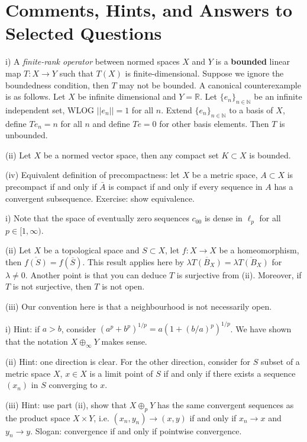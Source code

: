 \documentclass[12pt]{article}
\newcommand{\N}{\mathbb{N}}
\newcommand{\R}{\mathbb{R}}
\newenvironment{onquestion}[2][On Question]{\begin{trivlist}
\item[\hskip \labelsep {\bfseries #1}\hskip \labelsep {\bfseries #2.}]}{\end{trivlist}}
\begin{document}
\section{Comments, Hints, and Answers to Selected Questions}
\begin{onquestion}{1.2}
	(i) A \textit{finite-rank operator} between normed spaces $X$ and $Y$ is a \textbf{bounded} linear map $T:X\rightarrow Y$ such that $T(X)$ is finite-dimensional. Suppose we ignore the boundedness condition, then $T$ may not be bounded.  A canonical counterexample is as follows. Let $X$ be infinite dimensional and $Y = \R$. Let $\{e_n\}_{n\in \N}$ be an infinite independent set, WLOG $||e_n|| = 1$ for all $n$. Extend $\{e_n\}_{n\in \N}$ to a basis of $X$, define $Te_n = n$ for all $n$ and define $Te = 0$ for other basis elements.  Then $T$ is unbounded.
	
	(ii) Let $X$ be a normed vector space, then any compact set $K \subset X$ is bounded.
	
	(iv) Equivalent definition of precompactness: let $X$ be a metric space, $A \subset X$ is precompact if and only if $\bar{A}$ is compact if and only if every sequence in $A$ has a convergent subsequence. Exercise: show equivalence.
\end{onquestion}

\begin{onquestion}{1.4}
	(i) Note that the space of eventually zero sequences $c_{00}$ is dense in $\ell_p$ for all $p\in [1,\infty)$.
	
	(ii) Let $X$ be a topological space and $S \subset X$, let $f:X \rightarrow X$ be a homeomorphism, then $\overline{f(S)} = f(\overline{S})$. This result applies here by $\lambda \overline{T(B_X)} = \overline{\lambda T(B_X)}$ for $\lambda \not = 0$. Another point is that you can deduce $T$ is surjective from (ii). Moreover, if $T$ is not surjective, then $T$ is not open.
	
	(iii) Our convention here is that a neighbourhood is not necessarily open.
\end{onquestion}

\begin{onquestion}{1.5}
	(i) Hint: if $a>b$, consider $(a^p+b^p)^{1/p} = a (1 + (b/a)^p)^{1/p}$. We have shown that the notation $X\oplus_\infty Y$ makes sense.
	
	(ii) Hint: one direction is clear. For the other direction, consider for $S$ subset of a metric space $X$, $x \in X$ is a limit point of $S$ if and only if there exists a sequence $(x_n)$ in $S$ converging to $x$.
	
	(iii) Hint: use part (ii), show that $X\oplus_p Y$ has the same convergent sequences as the product space $X\times Y$, i.e. $(x_n,y_n)\rightarrow (x,y)$ if and only if $x_n \rightarrow x$ and $y _n \rightarrow y$. Slogan: convergence if and only if pointwise convergence.
\end{onquestion}
\end{document}
